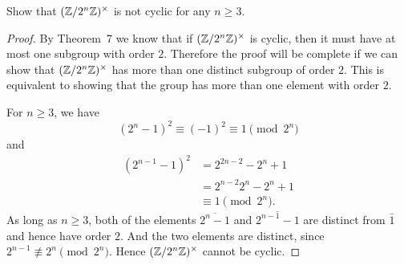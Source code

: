  Show that $(\mathbb{Z}/2^n\mathbb{Z})^\times$ is not cyclic for any
$n\geq3$.
\begin{proof}
  By Theorem~7 we know that if $(\mathbb{Z}/2^n\mathbb{Z})^\times$ is cyclic, then it
  must have at most one subgroup with order $2$. Therefore the proof
  will be complete if we can show that $(\mathbb{Z}/2^n\mathbb{Z})^\times$ has more
  than one distinct subgroup of order $2$. This is equivalent to
  showing that the group has more than one element with order $2$.

  For $n\geq3$, we have
  \begin{equation*}
    (2^n-1)^2 \equiv (-1)^2 \equiv 1 \pmod{2^n}
  \end{equation*}
  and
  \begin{align*}
    (2^{n-1}-1)^2
    &= 2^{2n-2} - 2^n + 1 \\
    &= 2^{n-2}2^n - 2^n + 1 \\
    &\equiv 1 \pmod{2^n}.
  \end{align*}
  As long as $n\geq3$, both of the elements $\overline{2^n-1}$ and
  $\overline{2^{n-1}-1}$ are distinct from $\bar1$ and hence have
  order $2$. And the two elements are distinct, since
  $2^{n-1}\not\equiv2^n\pmod{2^n}$. Hence $(\mathbb{Z}/2^n\mathbb{Z})^\times$ cannot
  be cyclic.
\end{proof}

